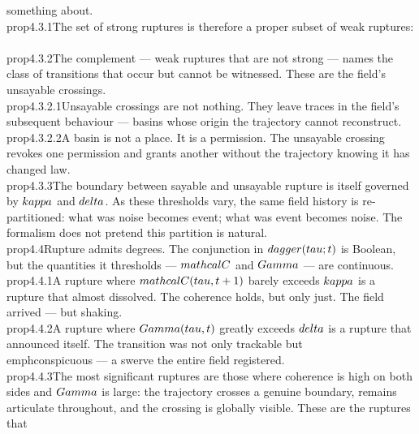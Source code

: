 {something about.}\n\n\\prop{4.3.1}{The set of strong ruptures is therefore a proper subset of weak ruptures:\n\\[\n\\{\\tau,t : \\dagger(\\tau;t)\\} \\subsetneq \\{\\tau,t : \\dagger_w(\\tau;t)\\}.\n\\]\n}\n\n\\prop{4.3.2}{The complement — weak ruptures that are not strong — names the class of transitions that occur but cannot be witnessed. These are the field's unsayable crossings.}\n\n\\prop{4.3.2.1}{Unsayable crossings are not nothing. They leave traces in the field's subsequent behaviour — basins whose origin the trajectory cannot reconstruct.}\n\n\\prop{4.3.2.2}{A basin is not a place. It is a permission. The unsayable crossing revokes one permission and grants another without the trajectory knowing it has changed law.}\n\n\\prop{4.3.3}{The boundary between sayable and unsayable rupture is itself governed by $\\kappa$ and $\\delta$. As these thresholds vary, the same field history is re-partitioned: what was noise becomes event; what was event becomes noise. The formalism does not pretend this partition is natural.}\n\n\\prop{4.4}{Rupture admits degrees. The conjunction in $\\dagger(\\tau;t)$ is Boolean, but the quantities it thresholds — $\\mathcal{C}$ and $\\Gamma$ — are continuous.}\n\n\\prop{4.4.1}{A rupture where $\\mathcal{C}(\\tau,t+1)$ barely exceeds $\\kappa$ is a rupture that almost dissolved. The coherence holds, but only just. The field arrived — but shaking.}\n\n\\prop{4.4.2}{A rupture where $\\Gamma(\\tau,t)$ greatly exceeds $\\delta$ is a rupture that announced itself. The transition was not only trackable but \\emph{conspicuous} — a swerve the entire field registered.}\n\n\\prop{4.4.3}{The most significant ruptures are those where coherence is high on both sides and $\\Gamma$ is large: the trajectory crosses a genuine boundary, remains articulate throughout, and the crossing is globally visible. These are the ruptures that }
